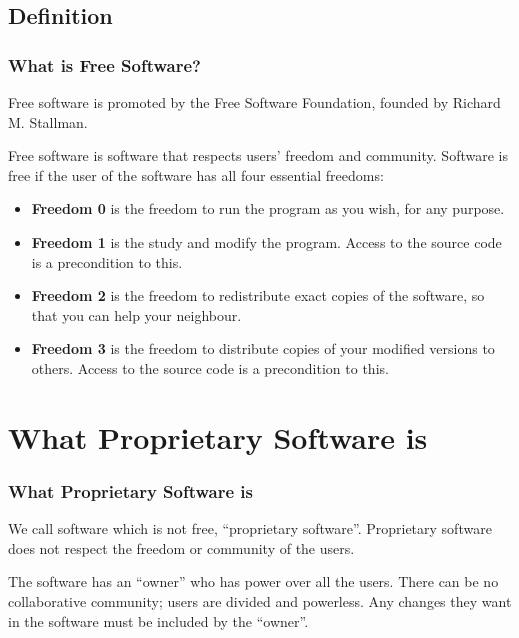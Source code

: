 \documentclass{beamer}
\begin{document}

\subsection{Definition}

\begin{frame}
\frametitle{What is Free Software?}

Free software is promoted by the Free Software Foundation, founded by 
Richard M. Stallman.

Free software is software that respects users' freedom and community.
Software is free if the user of the software has all four essential freedoms:

\begin{itemize}
\item {\bf Freedom 0} is the freedom to run the program as you wish, 
  for any purpose.
\item {\bf Freedom 1} is the study and modify the program. 
  Access to the source code is a precondition to this.
\item {\bf Freedom 2} is the freedom to redistribute exact copies of the 
  software, so that you can help your neighbour.
\item {\bf Freedom 3} is the freedom to distribute copies of your 
  modified versions to others. Access to the source code is a precondition 
  to this.
\end{itemize}
\end{frame}


\section{What Proprietary Software is}

\begin{frame}
\frametitle{What Proprietary Software is}

We call software which is not free, ``proprietary software''.
Proprietary software does not respect the freedom or community of the users.

The software has an ``owner'' who has power over all the users.
There can be no collaborative community; users are divided and 
powerless. Any changes they want in the software must be included by
the ``owner''.


\end{frame}
\end{document}
